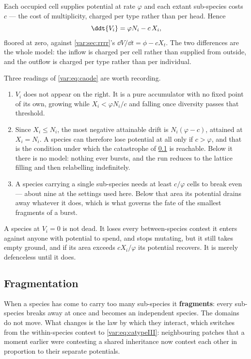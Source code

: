 Each occupied cell supplies potential at rate $\varphi$ and each extant
sub-species costs $c$ --- the cost of multiplicity, charged per type rather
than per head. Hence
\begin{equation}
\ddt{V_i}=\varphi N_i-c\,X_i ,
\label{var:eq:caode}
\end{equation}
floored at zero, against \cref{var:sec:rrrr}'s
$\dd V/\dd t=\phi-cX_t$. The two differences are the whole model: the inflow
is charged per cell rather than supplied from outside, and the outflow is
charged per type rather than per individual.

Three readings of \cref{var:eq:caode} are worth recording.
\begin{enumerate}[label=(\roman*),leftmargin=2.1em,itemsep=0.25em,topsep=0.25em]
\item $V_i$ does not appear on the right. It is a pure accumulator with no
fixed point of its own, growing while $X_i<\varphi N_i/c$ and falling once
diversity passes that threshold.
\item Since $X_i\le N_i$, the most negative attainable drift is
$N_i(\varphi-c)$, attained at $X_i=N_i$. A species can therefore lose
potential at all only if $c>\varphi$, and that is the condition under which
the catastrophe of \cref{var:sec:cafragment} is reachable. Below it there is
no model: nothing ever bursts, and the run reduces to the lattice filling and
then relabelling indefinitely.
\item A species carrying a single sub-species needs at least $c/\varphi$
cells to break even --- about nine at the settings used here. Below that area
its potential drains away whatever it does, which is what governs the fate of
the smallest fragments of a burst.
\end{enumerate}

A species at $V_i=0$ is not dead. It loses every between-species contest it
enters against anyone with potential to spend, and stops mutating, but it
still takes empty ground, and if its area exceeds $cX_i/\varphi$ its
potential recovers. It is merely defenceless until it does.

\subsection{Fragmentation}
\label{var:sec:cafragment}

When a species has come to carry too many sub-species it \textbf{fragments}:
every sub-species breaks away at once and becomes an independent species. The
domains do not move. What changes is the law by which they interact, which
switches from the within-species contest to \cref{var:eq:catypeIII}:
neighbouring patches that a moment earlier were contesting a shared
inheritance now contest each other in proportion to their separate
potentials.

